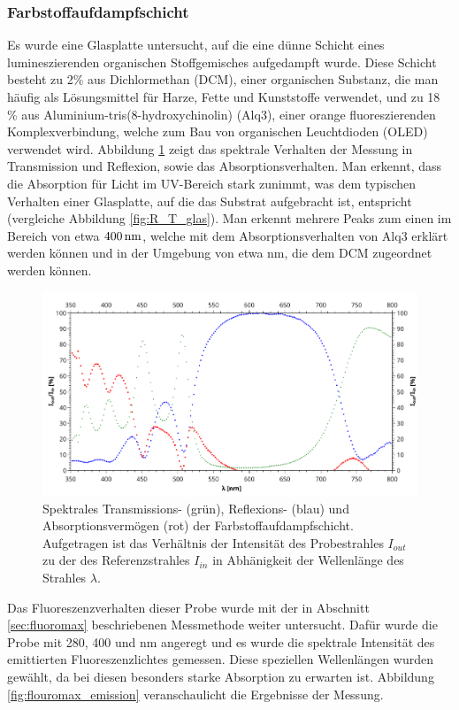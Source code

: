 	\subsubsection{Farbstoffaufdampfschicht} \label{sec:organisch}
		Es wurde eine Glasplatte untersucht, auf die eine dünne Schicht eines lumineszierenden organischen Stoffgemisches aufgedampft wurde. Diese Schicht besteht zu 2\% aus Dichlormethan (DCM), einer organischen Substanz, die man häufig als Lösungsmittel für Harze, Fette und Kunststoffe verwendet\cite{dcm}, und zu 18 \% aus Aluminium-tris(8-hydroxychinolin) (Alq3), einer orange fluoreszierenden Komplexverbindung, welche zum Bau von organischen Leuchtdioden (OLED) verwendet wird.  Abbildung \ref{fig:TRA_organisch} zeigt das spektrale Verhalten der Messung in Transmission und Reflexion, sowie das Absorptionsverhalten. Man erkennt, dass die Absorption für Licht im UV-Bereich stark zunimmt, was dem typischen Verhalten einer Glasplatte, auf die das Substrat aufgebracht ist, entspricht (vergleiche Abbildung \ref{fig:R_T_glas}). Man erkennt mehrere Peaks zum einen im Bereich von etwa $\unit[400]{nm}$, welche mit dem Absorptionsverhalten von Alq3 erklärt werden können und in der Umgebung von etwa \unit[500]{nm}, die dem DCM zugeordnet werden können.\\
		\begin{figure}[htb]
			\centering
			\includegraphics[width=0.75\linewidth]{pic/TRA_organisch.pdf}
			\caption{Spektrales Transmissions- (grün), Reflexions- (blau) und Absorptionsvermögen (rot) der Farbstoffaufdampfschicht. Aufgetragen ist das Verhältnis der Intensität des Probestrahles $I_{out}$ zu der des Referenzstrahles $I_{in}$ in Abhänigkeit der Wellenlänge des Strahles $\lambda$.}
			\label{fig:TRA_organisch}
		\end{figure} 
		Das Fluoreszenzverhalten dieser Probe wurde mit der in Abschnitt \ref{sec:fluoromax} beschriebenen Messmethode weiter untersucht. Dafür wurde die Probe mit 280, 400 und \unit[500]{nm} angeregt und es wurde die spektrale Intensität des emittierten Fluoreszenzlichtes gemessen. Diese speziellen Wellenlängen wurden gewählt, da bei diesen besonders starke Absorption zu erwarten ist. Abbildung \ref{fig:flouromax_emission} veranschaulicht die Ergebnisse der Messung.
